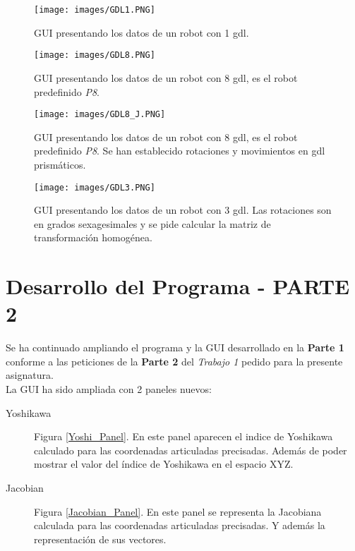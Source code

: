 \documentclass[a4paper, fontsize=11pt]{scrartcl} %
\numberwithin{equation}{section} %
\numberwithin{figure}{section} %
\numberwithin{table}{section} %
\begin{document}
	\begin{figure}[h!]
		\centering
		\texttt{[image: images/GDL1.PNG]}
		\caption{GUI presentando los datos de un robot con 1 gdl.}
		\label{GDL1}
	\end{figure}
	\FloatBarrier
	
	\begin{figure}[h!]
		\centering
		\texttt{[image: images/GDL8.PNG]}
		\caption{GUI presentando los datos de un robot con 8 gdl, es el robot predefinido \textit{P8}.}
		\label{GDL8}
	\end{figure}
	\FloatBarrier
	
	\begin{figure}[h!]
		\centering
		\texttt{[image: images/GDL8\_J.PNG]}
		\caption{GUI presentando los datos de un robot con 8 gdl, es el robot predefinido \textit{P8}. Se han establecido rotaciones y movimientos en gdl prismáticos.}
		\label{GDL8_J}
	\end{figure}
	\FloatBarrier
	
	\begin{figure}[h!]
		\centering
		\texttt{[image: images/GDL3.PNG]}
		\caption{GUI presentando los datos de un robot con 3 gdl. Las rotaciones son en grados sexagesimales y se pide calcular la matriz de transformación homogénea.}
		\label{GDL3}
	\end{figure}
	\FloatBarrier
	
	\section{Desarrollo del Programa - PARTE 2}
	
	Se ha continuado ampliando el programa y la GUI desarrollado en la \textbf{Parte 1} conforme a las peticiones de la \textbf{Parte 2} del \textit{Trabajo 1} pedido para la presente asignatura.\\
	
	La GUI ha sido ampliada con 2 paneles nuevos:
	
	\begin{description}
		\item[Yoshikawa] Figura \ref{Yoshi_Panel}. En este panel aparecen el indice de Yoshikawa calculado para las coordenadas articuladas precisadas. Además de poder mostrar el valor del índice de Yoshikawa en el espacio XYZ. 
		\item[Jacobian] Figura \ref{Jacobian_Panel}. En este panel se representa la Jacobiana calculada para las coordenadas articuladas precisadas. Y además la representación de sus vectores.
	\end{description}
	
\end{document}
